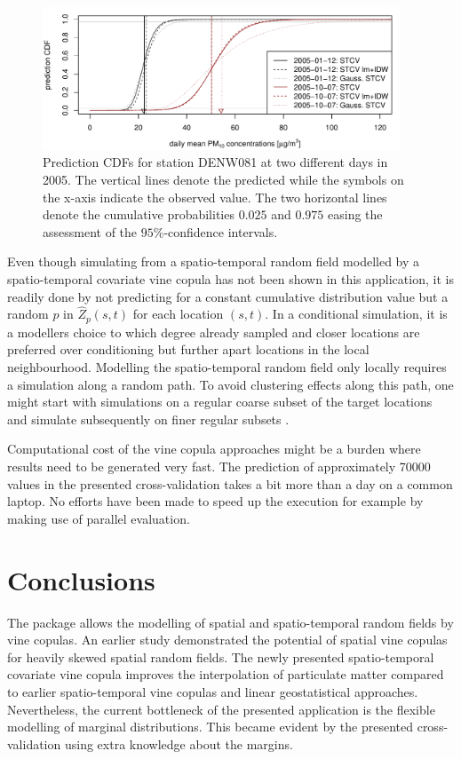 \documentclass[article,nojss]{jss}
\begin{document}
\begin{figure}
\center
\includegraphics[width=0.95\textwidth]{condPredCDF.pdf}
\caption{Prediction CDFs for station DENW081 at two different days in 2005. The vertical lines denote the predicted while the symbols on the x-axis indicate the observed value. The two horizontal lines denote the cumulative probabilities $0.025$ and $0.975$ easing the  assessment of the $95\%$-confidence intervals.\label{fig:predDensity}}
\end{figure}

Even though simulating from a spatio-temporal random field modelled by a spatio-temporal covariate vine copula has not been shown in this application, it is readily done by not predicting for a constant cumulative distribution value but a random $p$ in $\widehat{Z}_p(s,t)$ for each location $(s,t)$. In a conditional simulation, it is a modellers choice to which degree already sampled and closer locations are preferred over conditioning but further apart locations in the local neighbourhood. Modelling the spatio-temporal random field only locally requires a simulation along a random path. To avoid clustering effects along this path, one might start with simulations on a regular coarse subset of the target locations and simulate subsequently on finer regular subsets \citep{Gomez-Hernandez1991}.

Computational cost of the vine copula approaches might be a burden where results need to be generated very fast. The prediction of approximately 70000 values in the presented cross-validation takes a bit more than a day on a common laptop. No efforts have been made to speed up the execution for example by making use of parallel evaluation. 

\section{Conclusions}
\label{sec:conclusion}
The  package allows the modelling of spatial and spatio-temporal random fields by vine copulas. An earlier study \citep{Graler2014} demonstrated the potential of spatial vine copulas for heavily skewed spatial random fields. The newly presented spatio-temporal covariate vine copula improves the interpolation of particulate matter compared to earlier spatio-temporal vine copulas \citep{Graler2012} and linear geostatistical approaches. Nevertheless, the current bottleneck of the presented application is the flexible modelling of marginal distributions. This became evident by the presented cross-validation using extra knowledge about the margins.
\end{document}

